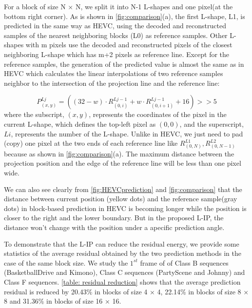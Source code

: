 \documentclass[journal]{IEEEtran}
\begin{document}
For a block of size N × N, we split it into N-1 L-shapes and one pixel(at the bottom right corner). As is shown in \autoref{fig:comparison}(a), the first L-shape, L1, is predicted in the same way as HEVC, using the decoded and reconstructed samples of the nearest neighboring blocks (L0) as reference samples. Other L-shapes with m pixels use the decoded and reconstructed pixels of the closest neighboring L-shape which has m+2 pixels as reference line. Except for the reference samples, the generation of the predicted value is almost the same as in HEVC which calculates the linear interpolations of two reference samples neighbor to the intersection of the projection line and the reference line:

\begin{equation}
P_{(x,y)}^{Lj} =((32-w)\cdot R_{(0,i)}^{Lj-1} +w\cdot R_{(0,i+1)}^{Lj-1} +16)>>5
\end{equation}
where the subscript, $(x,y)$, represents the coordinates of the pixel in the current L-shape, which defines the top-left pixel as $(0,0)$, and the superscript, $Li$, represents the number of the L-shape.
Unlike in HEVC, we just need to pad (copy) one pixel at the two ends of each reference line like $R_{(0,N)}^{L1},R_{(0,N-1)}^{L2}$ because as shown in \autoref{fig:comparison}(a). The maximum distance between the projection position and the edge of the reference line will be less than one pixel wide.

We can also see clearly from \autoref{fig:HEVCprediction} and \autoref{fig:comparison} that the distance between current position (yellow dots) and the reference sample(gray dots) in block-based prediction in HEVC is becoming longer while the position is closer to the right and the lower boundary. But in the proposed L-IP, the distance won't change with the position under a apecific prediction angle. 

To demonstrate that the L-IP can reduce the residual energy, we provide some statistics of the average residual obtained by the two prediction methods in the case of the same block size. We  study the $1^{st}$ frame of of Class B sequences (BasketballDrive and Kimono), Class C sequences (PartyScene and Johnny) and Class F sequences. \autoref{table: residual reduction} shows that the average prediction residual is reduced by 20.43\% in blocks of size 4 × 4, 22.14\% in blocks of size 8 × 8 and 31.36\% in blocks of size 16 × 16. 
\end{document}
